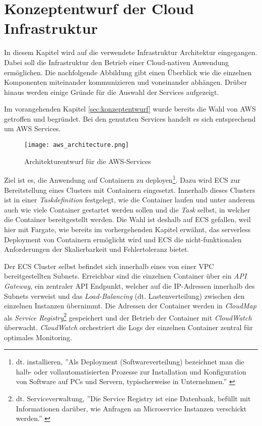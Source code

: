 \section{Konzeptentwurf der Cloud Infrastruktur}
\label{sec:cloud-infra}
In diesem Kapitel wird auf die verwendete Infrastruktur Architektur eingegangen. %
\mbox{Dabei} soll die Infrastruktur den Betrieb einer Cloud-nativen Anwendung ermöglichen. Die nachfolgende Abbildung gibt einen Überblick wie die einzelnen Komponenten miteinander kommunizieren und voneinander abhängen. Drüber hinaus werden einige Gründe für die Auswahl der Services aufgezeigt.

Im vorangehenden Kapitel \ref{sec:konzeptentwurf} wurde bereits die Wahl von \ac{AWS} getroffen und begründet. Bei den genutzten Services handelt es sich entsprechend um \ac{AWS} Services.

\begin{figure}[H]
    \centering
    \texttt{[image: aws\_architecture.png]}
    \caption{Architekturentwurf für die AWS-Services}
    \label{fig:CloudArchitektur}
\end{figure}

Ziel ist es, die Anwendung auf Containern zu deployen\footnote{dt. installieren, ''Als Deployment (Softwareverteilung) bezeichnet man die halb- oder vollautomatisierten Prozesse zur Installation und Konfiguration von Software auf PCs und Servern, typischerweise in Unternehmen.'' \cite[][]{arocom}}. Dazu wird \ac{ECS} zur Bereitstellung eines Clusters mit Containern eingesetzt. Innerhalb dieses Clusters ist in einer \textit{Taskdefinition} festgelegt, wie die Container laufen und unter anderem auch wie viele Container gestartet werden sollen und die \textit{Task} selbst, in welcher die Container bereitgestellt werden. Die Wahl ist deshalb auf \ac{ECS} gefallen, weil hier mit \gls{Fargate}, wie bereits im vorhergehenden Kapitel erwähnt, das serverless Deployment von Containern ermöglicht wird und \ac{ECS} die nicht-funktionalen Anforderungen der Skalierbarkeit und Fehlertoleranz bietet. \pagebreak

Der \ac{ECS} Cluster selbst befindet sich innerhalb eines von einer \ac{VPC} bereitgestellten Subnets. Erreichbar sind die einzelnen Container über ein \textit{API Gateway}, ein zentraler API Endpunkt, welcher auf die IP-Adressen innerhalb des Subnets verweist und das \textit{Load-Balancing} (dt. Lastenverteilung) zwischen den einzelnen Instanzen übernimmt. Die Adressen der Container werden in \textit{CloudMap} als \textit{Service Registry}\footnote{dt. Serviceverwaltung, ''Die Service Registry ist eine Datenbank, befüllt mit Informationen darüber, wie Anfragen an Microservice Instanzen verschickt werden.'' \cite[Übersetzt aus dem Englischen][]{Peyrott2015}} gespeichert und der Betrieb der Container mit \textit{CloudWatch} überwacht. \textit{CloudWatch} orchestriert die Logs der einzelnen Container zentral für optimales Monitoring.

